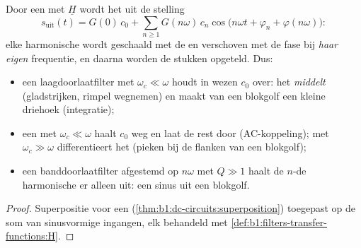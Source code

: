 \begin{proposition}\label{prop:b1:filters-transfer-functions:filtering}
Door een  met  $\underline H$ wordt het  uit de
stelling
\[
s_{\text{uit}}(t) = G(0)\,c_0 + \sum_{n \geq 1} G(n\omega)\,c_n\cos\!\big(n\omega t + \varphi_n + \varphi(n\omega)\big):
\]
elke harmonische wordt geschaald met de  en verschoven met de fase bij
\emph{haar eigen} frequentie, en daarna worden de stukken opgeteld. Dus:
\begin{itemize}
  \item een laagdoorlaatfilter met $\omega_c \ll \omega$ houdt in wezen $c_0$ over:
        het \emph{middelt} (gladstrijken, rimpel wegnemen) en maakt van een
        blokgolf een kleine driehoek (integratie);
  \item een  met $\omega_c \ll \omega$ haalt $c_0$ weg en laat
        de rest door (AC-koppeling); met $\omega_c \gg \omega$
        differentieert het (pieken bij de flanken van een blokgolf);
  \item een banddoorlaatfilter afgestemd op $n\omega$ met $Q \gg 1$ haalt de
        $n$-de harmonische er alleen uit: een sinus uit een blokgolf.
\end{itemize}
\end{proposition}

\begin{proof}
Superpositie voor een  (\cref{thm:b1:dc-circuits:superposition})
toegepast op de som van sinusvormige ingangen, elk behandeld met
\cref{def:b1:filters-transfer-functions:H}.
\end{proof}

